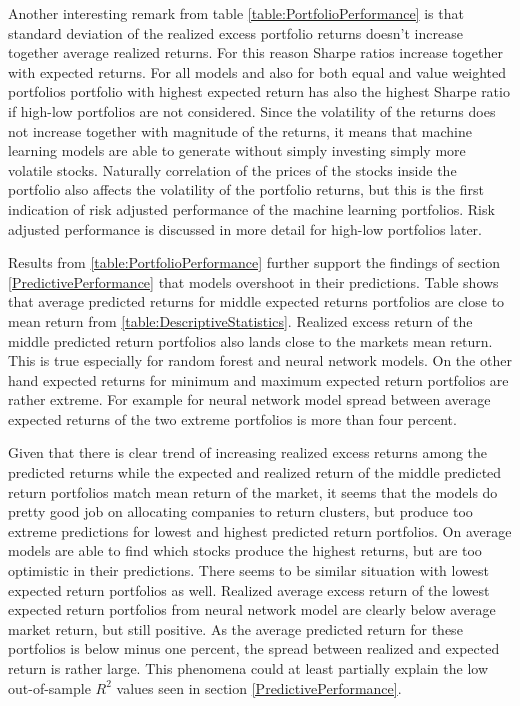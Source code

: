 \documentclass{article}
\begin{document}
Another interesting remark from table \ref{table:PortfolioPerformance} is that standard deviation of the realized excess portfolio returns doesn't increase together average realized returns. For this reason Sharpe ratios increase together with expected returns. For all models and also for both equal and value weighted portfolios portfolio with highest expected return has also the highest Sharpe ratio if high-low portfolios are not considered. Since the volatility of the returns does not increase together with magnitude of the returns, it means that machine learning models are able to generate without simply investing simply more volatile stocks. Naturally correlation of the prices of the stocks inside the portfolio also affects the volatility of the portfolio returns, but this is the first indication of risk adjusted performance of the machine learning portfolios. Risk adjusted performance is discussed in more detail for high-low portfolios later. \par

Results from \ref{table:PortfolioPerformance} further support the findings of section \ref{PredictivePerformance} that models overshoot in their predictions. Table shows that average predicted returns for middle expected returns portfolios are close to mean return from \ref{table:DescriptiveStatistics}. Realized excess return of the middle predicted return portfolios also lands close to the markets mean return. This is true especially for random forest and neural network models. On the other hand expected returns for minimum and maximum expected return portfolios are rather extreme. For example for neural network model spread between average expected returns of the two extreme portfolios is more than four percent. \par

Given that there is clear trend of increasing realized excess returns among the predicted returns while the expected and realized return of the middle predicted return portfolios match mean return of the market, it seems that the models do pretty good job on allocating companies to return clusters, but produce too extreme predictions for lowest and highest predicted return portfolios. On average models are able to find which stocks produce the highest returns, but are too optimistic in their predictions. There seems to be similar situation with lowest expected return portfolios as well. Realized average excess return of the lowest expected return portfolios from neural network model are clearly below average market return, but still positive. As the average predicted return for these portfolios is below minus one percent, the spread between realized and expected return is rather large. This phenomena could at least partially explain the low out-of-sample $R^2$ values seen in section \ref{PredictivePerformance}. \par  
\end{document}

